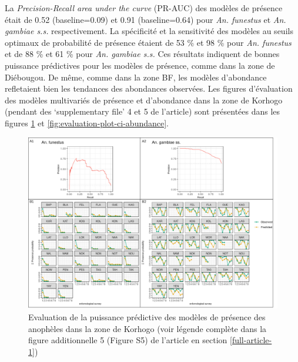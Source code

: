 \documentclass[12pt,twoside]{reedthesis}
\begin{document}
La \emph{Precision-Recall area under the curve} (PR-AUC) des modèles de présence était de 0.52 (baseline=0.09) et 0.91 (baseline=0.64) pour \emph{An. funestus} et \emph{An. gambiae s.s.} respectivement. La spécificité et la sensitivité des modèles au seuils optimaux de probabilité de présence étaient de 53 \% et 98 \% pour \emph{An. funestus} et de 88 \% et 61 \% pour \emph{An. gambiae s.s.} Ces résultats indiquent de bonnes puissance prédictives pour les modèles de présence, comme dans la zone de Diébougou. De même, comme dans la zone BF, les modèles d'abondance refletaient bien les tendances des abondances observées. Les figures d'évaluation des modèles multivariés de présence et d'abondance dans la zone de Korhogo (pendant des `supplementary file' 4 et 5 de l'article) sont présentées dans les figures \ref{fig:evaluation-plot-ci-presence} et \ref{fig:evaluation-plot-ci-abundance}.\\
\begin{figure}

{\centering \includegraphics[width=1.1\linewidth]{figure/modelevaluation_ci_presence} 

}

\caption[Evaluation de la puissance prédictive des modèles de présence des anophèles dans la zone de Korhogo]{Evaluation de la puissance prédictive des modèles de présence des anophèles dans la zone de Korhogo (voir légende complète dans la figure additionnelle 5 (Figure S5) de l'article en section \ref{full-article-1})}\label{fig:evaluation-plot-ci-presence}
\end{figure}
\end{document}
